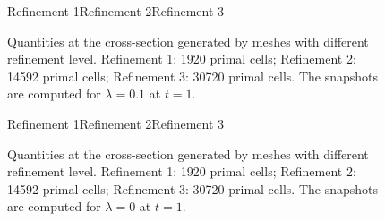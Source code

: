 \documentclass{article}
\begin{document}
\begin{figure}
    \centering
    Refinement 1\hspace{2.5cm}Refinement 2\hspace{2.5cm}Refinement 3\hspace{1cm}
    
    \caption{Quantities at the cross-section generated by meshes with different refinement level. Refinement 1: 1920 primal cells; Refinement 2: 14592 primal cells; Refinement 3: 30720 primal cells. The snapshots are computed for $\lambda = 0.1$ at $t = 1$.}
    \label{fig:grid_study_3d_clip_lambda-1e-1}
\end{figure}

\begin{figure}
    \centering
    Refinement 1\hspace{2.5cm}Refinement 2\hspace{2.5cm}Refinement 3\hspace{1cm}
    
    \caption{Quantities at the cross-section generated by meshes with different refinement level. Refinement 1: 1920 primal cells; Refinement 2: 14592 primal cells; Refinement 3: 30720 primal cells. The snapshots are computed for $\lambda = 0$ at $t = 1$.}
    \label{fig:grid_study_3d_clip_lambda-0}
\end{figure}
\end{document}
